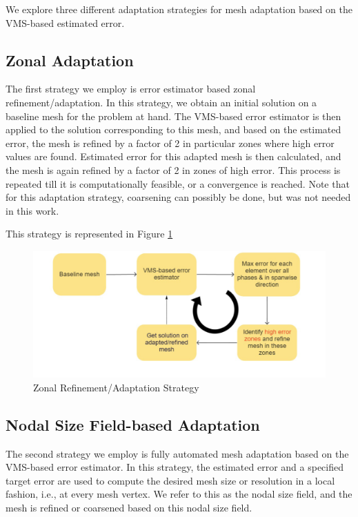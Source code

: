 We explore three different adaptation strategies for mesh adaptation based on the VMS-based estimated error. 

\subsection{Zonal Adaptation}



The first strategy we employ is error estimator based zonal refinement/adaptation. 
In this strategy, we obtain an initial solution on a baseline mesh for the problem at hand. The VMS-based error estimator is then applied to the solution corresponding to this mesh, and based on the estimated error, the mesh is refined by a factor of 2 in particular zones where high error values are found. Estimated error for this adapted mesh is then calculated, and the mesh is again refined by a factor of 2 in zones of high error. This process is repeated till it is computationally feasible, or a convergence is reached.
Note that for this adaptation strategy, coarsening can possibly be done, but was not needed in this work.

This strategy is represented in Figure \ref{fig:zonal_based_strat}

\begin{figure}[H]
	\centering
	\includegraphics[width=1\textwidth]{figures/adapt_strat/zonal_based.png}
	\caption{Zonal Refinement/Adaptation Strategy}
	\label{fig:zonal_based_strat}
\end{figure}

\subsection{Nodal Size Field-based Adaptation}

The second strategy we employ is fully automated mesh adaptation based on the VMS-based error estimator. In this strategy, the estimated error and a specified target error are used to compute the desired mesh size or resolution in a local fashion, i.e., at every mesh vertex. We refer to this as the nodal size field, and the mesh is refined or coarsened based on this nodal size field. 

